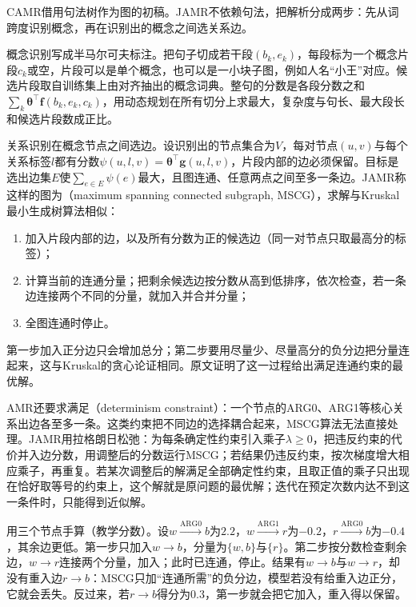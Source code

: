 CAMR借用句法树作为图的初稿。JAMR不依赖句法，把解析分成两步：先从词跨度识别概念，再在识别出的概念之间选关系边。

概念识别写成半马尔可夫标注。把句子切成若干段$(b_k,e_k)$，每段标为一个概念片段$c_k$或空，片段可以是单个概念，也可以是一小块子图，例如人名“小王”对应。候选片段取自训练集上由对齐抽出的概念词典。整句的分数是各段分数之和$\sum_k\bm\theta^{\top}\bm f(b_k,e_k,c_k)$，用动态规划在所有切分上求最大，复杂度与句长、最大段长和候选片段数成正比。

关系识别在概念节点之间选边。设识别出的节点集合为$V$，每对节点$(u,v)$与每个关系标签$l$都有分数$\psi(u,l,v)=\bm\theta^{\top}\bm g(u,l,v)$，片段内部的边必须保留。目标是选出边集$E$使$\sum_{e\in E}\psi(e)$最大，且图连通、任意两点之间至多一条边。JAMR称这样的图为（maximum spanning connected subgraph, MSCG），求解与Kruskal最小生成树算法相似：
\begin{enumerate}
  \item 加入片段内部的边，以及所有分数为正的候选边（同一对节点只取最高分的标签）；
  \item 计算当前的连通分量；把剩余候选边按分数从高到低排序，依次检查，若一条边连接两个不同的分量，就加入并合并分量；
  \item 全图连通时停止。
\end{enumerate}
第一步加入正分边只会增加总分；第二步要用尽量少、尽量高分的负分边把分量连起来，这与Kruskal的贪心论证相同。原文证明了这一过程给出满足连通约束的最优解。

AMR还要求满足（determinism constraint）：一个节点的ARG0、ARG1等核心关系出边各至多一条。这类约束把不同边的选择耦合起来，MSCG算法无法直接处理。JAMR用拉格朗日松弛：为每条确定性约束引入乘子$\lambda\geq0$，把违反约束的代价并入边分数，用调整后的分数运行MSCG；若结果仍违反约束，按次梯度增大相应乘子，再重复。若某次调整后的解满足全部确定性约束，且取正值的乘子只出现在恰好取等号的约束上，这个解就是原问题的最优解；迭代在预定次数内达不到这一条件时，只能得到近似解。

用三个节点手算（教学分数）。设$w\xrightarrow{\mathrm{ARG0}}b$为$2.2$，$w\xrightarrow{\mathrm{ARG1}}r$为$-0.2$，$r\xrightarrow{\mathrm{ARG0}}b$为$-0.4$，其余边更低。第一步只加入$w\to b$，分量为$\{w,b\}$与$\{r\}$。第二步按分数检查剩余边，$w\to r$连接两个分量，加入；此时已连通，停止。结果有$w\to b$与$w\to r$，却没有重入边$r\to b$：MSCG只加“连通所需”的负分边，模型若没有给重入边正分，它就会丢失。反过来，若$r\to b$得分为$0.3$，第一步就会把它加入，重入得以保留。

